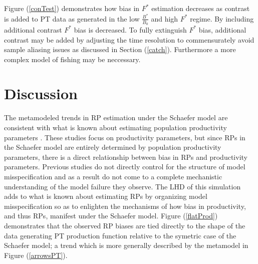 %
Figure (\ref{conTest}) demonstrates how bias in $F^*$ estimation %
decreases as contrast is added to PT data as generated in the low $\frac{B^*}{B_0}$ and
high $F^*$ regime. By including additional contrast $F^*$ bias is decreased. To fully 
extinguish $F^*$ bias, additional contrast may be added by adjusting the time resolution 
to commensurately avoid sample aliasing issues as discussed in Section (\ref{catch}). 
Furthermore a more complex model of fishing may be neccessary.  


%
\clearpage
\section{Discussion}


%
The metamodeled trends in RP estimation under the Schaefer model are consistent 
with what is known about estimating population productivity parameters 
\cite{lee_can_2012, conn_when_2010, magnusson_what_2007}. These studies 
focus on productivity parameters, but since RPs in the Schaefer model are 
entirely determined by population productivity parameters, there is a 
direct relationship between bias in RPs and productivity parameters. 
Previous studies do not directly control for the structure of model 
misspecification and as a result do not come to a complete mechanistic 
understanding of the model failure they observe.
%
The LHD of this simulation adds to what is known about estimating RPs by 
organizing model misspecification so as to enlighten the mechanisms of how 
bias in productivity, and thus RPs, manifest under the Schaefer model. 
Figure (\ref{flatProd}) demonstrates that the observed RP biases are tied directly to 
the shape of the data generating PT production function relative to the symetric case 
of the Schaefer model; a trend which is more generally described by the metamodel in 
Figure (\ref{arrowsPT}).

